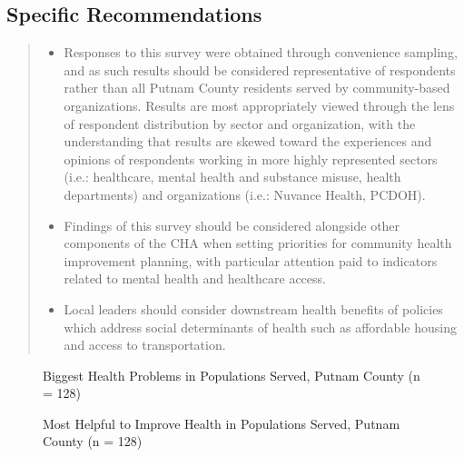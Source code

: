 \documentclass[
  english,
  letterpaper,
]{report}
\begin{document}
\subsection{Specific Recommendations}\label{specific-recommendations-2}

\begin{quote}
\begin{itemize}
\item
  Responses to this survey were obtained through convenience sampling,
  and as such results should be considered representative of respondents
  rather than all Putnam County residents served by community-based
  organizations. Results are most appropriately viewed through the lens
  of respondent distribution by sector and organization, with the
  understanding that results are skewed toward the experiences and
  opinions of respondents working in more highly represented sectors
  (i.e.: healthcare, mental health and substance misuse, health
  departments) and organizations (i.e.: Nuvance Health, PCDOH).
\item
  Findings of this survey should be considered alongside other
  components of the CHA when setting priorities for community health
  improvement planning, with particular attention paid to indicators
  related to mental health and healthcare access.
\item
  Local leaders should consider downstream health benefits of policies
  which address social determinants of health such as affordable housing
  and access to transportation.
\end{itemize}
\end{quote}

\begin{figure}


\caption{\label{fig-pc-big-hlth-prob}Biggest Health Problems in
Populations Served, Putnam County (n = 128)}

\end{figure}%

\begin{figure}


\caption{\label{fig-pc-help-improve-hlth}Most Helpful to Improve Health
in Populations Served, Putnam County (n = 128)}

\end{figure}%
\end{document}
